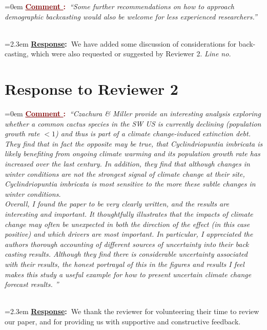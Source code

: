 \documentclass[12pt]{article}
\newcounter{cN}
\newcommand{\comment}[1]{
	\vspace{2em}
	\refstepcounter{cN} %
	\noindent \hangindent=0em \textbf{\textcolor{Maroon}{\uline{Comment \thecN}:~}}\emph{``#1''}
	}
\newcommand{\response}[1]{
	\\[0.25em]
	\hangindent=2.3em \textbf{\textcolor{NavyBlue}{\uline{Response}:~}}#1
	}
\begin{document}
\comment{Some further recommendations on how to approach demographic backcasting would also be welcome for less experienced researchers.}
\response{We have added some discussion of considerations for back-casting, which were also requested or suggested by Reviewer 2. \textit{Line no.}}

\section{Response to Reviewer 2}
\vspace{-2em}

\comment{Czachura \& Miller provide an interesting analysis exploring whether a common cactus species in the SW US is currently declining (population growth rate $<1$) and thus is part of a climate change-induced extinction debt. They find that in fact the opposite may be true, that Cyclindriopuntia imbricata is likely benefiting from ongoing climate warming and its population growth rate has increased over the last century. In addition, they find that although changes in winter conditions are not the strongest signal of climate change at their site, Cyclindriopuntia imbricata is most sensitive to the more these subtle changes in winter conditions. 
\\
Overall, I found the paper to be very clearly written, and the results are interesting and important. It thoughtfully illustrates that the impacts of climate change may often be unexpected in both the direction of the effect (in this case positive) and which drivers are most important.  In particular, I appreciated the authors thorough accounting of different sources of uncertainty into their back casting results. Although they find there is considerable uncertainty associated with their results, the honest portrayal of this in the figures and results I feel makes this study a useful example for how to present uncertain climate change forecast results. 
}
\response{We thank the reviewer for volunteering their time to review our paper, and for providing us with supportive and constructive feedback.}
\end{document}
